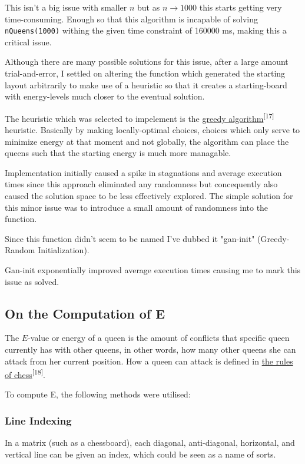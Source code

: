\documentclass{article}
\begin{document}
This isn't a big issue with smaller $n$ but as $n \to 1000$ this starts getting very time-consuming.
Enough so that this algorithm is incapable of solving \texttt{nQueens(1000)} withing the given time constraint of 160000 ms, making this a critical issue.

Although there are many possible solutions for this issue, after a large amount trial-and-error,
I settled on altering the function which generated the starting layout arbitrarily to make use of a heuristic so that it creates
a starting-board with energy-levels much closer to the eventual solution.

The heuristic which was selected to impelement is the \href{https://en.wikipedia.org/wiki/Greedy_algorithm}{greedy algorithm}\textsuperscript{[17]} heuristic.
Basically by making locally-optimal choices, choices which only serve to minimize energy at that moment and not globally,
the algorithm can place the queens such that the starting energy is much more managable.

Implementation initially caused a spike in stagnations and average execution times since this approach eliminated any randomness
but concequently also caused the solution space to be less effectively explored. The simple solution for this minor issue was to introduce a small amount of randomness
into the function.

Since this function didn't seem to be named I've dubbed it "gan-init" (Greedy-Random Initialization).

Gan-init exponentially improved average execution times causing me to mark this issue as solved.

\subsection{On the Computation of E}
The $E$-value or energy of a queen is the amount of conflicts that specific queen currently has with other queens, in other words,
how many other queens she can attack from her current position. How a queen can attack is defined in
\href{https://en.wikipedia.org/wiki/Queen_(chess)\#Placement\_and\_movement}{the rules of chess}\textsuperscript{[18]}.

To compute E, the following methods were utilised:

\clearpage
\subsubsection{Line Indexing}
In a matrix (such as a chessboard), each diagonal, anti-diagonal, horizontal, and vertical line can be given an index, which could be seen as a name of sorts.
\end{document}
